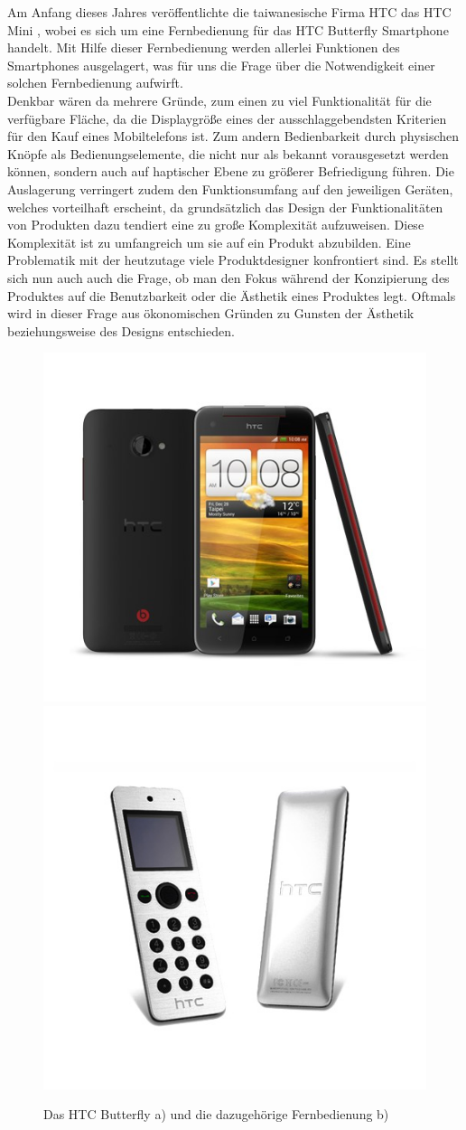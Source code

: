 \documentclass[parskip,headsepline, headtopline, %
footsepline, oneside, 12pt, headings=small]{scrreprt}
\begin{document}
Am Anfang dieses Jahres veröffentlichte die taiwanesische Firma HTC das HTC Mini \cite{htc}, wobei es sich um eine Fernbedienung für das HTC Butterfly Smartphone handelt. Mit Hilfe dieser Fernbedienung werden allerlei Funktionen des Smartphones ausgelagert, was für uns die Frage über die Notwendigkeit einer solchen Fernbedienung aufwirft.\\
Denkbar wären da mehrere Gründe, zum einen zu viel Funktionalität für die verfügbare Fläche, da die Displaygröße eines der ausschlaggebendsten Kriterien für den Kauf eines Mobiltelefons ist. Zum andern Bedienbarkeit durch physischen Knöpfe als Bedienungselemente, die nicht nur als bekannt vorausgesetzt werden können, sondern auch auf haptischer Ebene zu größerer Befriedigung führen. Die Auslagerung verringert zudem den Funktionsumfang auf den jeweiligen Geräten, welches vorteilhaft erscheint, da grundsätzlich das Design der Funktionalitäten von Produkten dazu tendiert eine zu große Komplexität aufzuweisen. Diese Komplexität ist zu umfangreich um sie auf ein Produkt abzubilden. Eine Problematik mit der heutzutage viele Produktdesigner konfrontiert sind. Es stellt sich nun auch auch die Frage, ob man den Fokus während der Konzipierung des Produktes auf die Benutzbarkeit oder die Ästhetik eines Produktes legt. Oftmals wird in dieser Frage aus ökonomischen Gründen zu Gunsten der Ästhetik beziehungsweise des Designs entschieden.

\begin{figure}[h]
\center
\includegraphics[width=.35\textwidth]{images/HTC-Butterfly}
\includegraphics[width=.35\textwidth]{images/htc-mini-fernbedienung}
\caption{Das HTC Butterfly a) und die dazugehörige Fernbedienung b)}
\label{fig:htc}
\end{figure}
\end{document}
